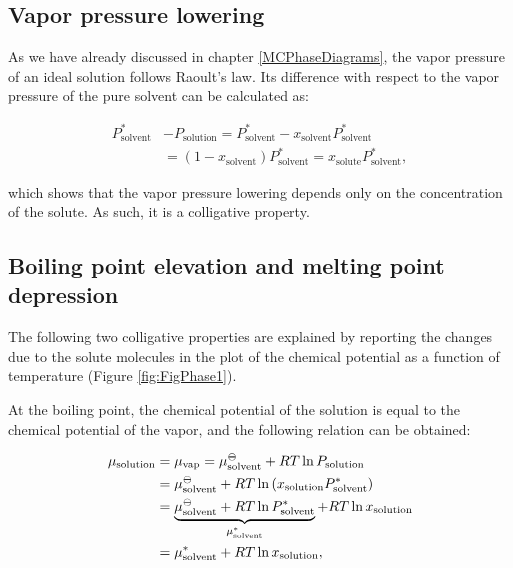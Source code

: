 \documentclass[
  9pt,
]{extbook}
\theoremstyle{definition}
\theoremstyle{definition}
\theoremstyle{definition}
\theoremstyle{definition}
\theoremstyle{remark}
\begin{document}
\subsection{Vapor pressure lowering}\label{vapor-pressure-lowering}

As we have already discussed in chapter \ref{MCPhaseDiagrams}, the vapor pressure of an ideal solution follows Raoult's law. Its difference with respect to the vapor pressure of the pure solvent can be calculated as:

\begin{equation}
\begin{aligned}
P_{\text{solvent}}^* &- P_{\text{solution}} = P_{\text{solvent}}^* - x_{\text{solvent}} P_{\text{solvent}}^* \\ 
& = \left( 1-x_{\text{solvent}}\right)P_{\text{solvent}}^* =x_{\text{solute}} P_{\text{solvent}}^*,
\end{aligned}
\label{eq:coll2}
\end{equation}

which shows that the vapor pressure lowering depends only on the concentration of the solute. As such, it is a colligative property.

\subsection{Boiling point elevation and melting point depression}\label{boiling-point-elevation-and-melting-point-depression}

The following two colligative properties are explained by reporting the changes due to the solute molecules in the plot of the chemical potential as a function of temperature (Figure \ref{fig:FigPhase1}).

At the boiling point, the chemical potential of the solution is equal to the chemical potential of the vapor, and the following relation can be obtained:

\begin{equation}
\begin{aligned}
\mu_{\text{solution}} &=\mu_{\text{vap}}=\mu_{\text{solvent}}^{{-\kern-6pt{\ominus}\kern-6pt-}} + RT \ln P_{\text{solution}} \\
&= \mu_{\text{solvent}}^{{-\kern-6pt{\ominus}\kern-6pt-}} + RT \ln \left(x_{\text{solution}} P_{\text{solvent}}^* \right)\\
&= \underbrace{\mu_{\text{solvent}}^{{-\kern-6pt{\ominus}\kern-6pt-}} + RT \ln P_{\text{solvent}}^*}_{\mu_{\text{solvent}}^*} + RT \ln x_{\text{solution}} \\
&= \mu_{\text{solvent}}^* + RT \ln x_{\text{solution}},
\end{aligned}
\label{eq:collA}
\end{equation}
\end{document}
